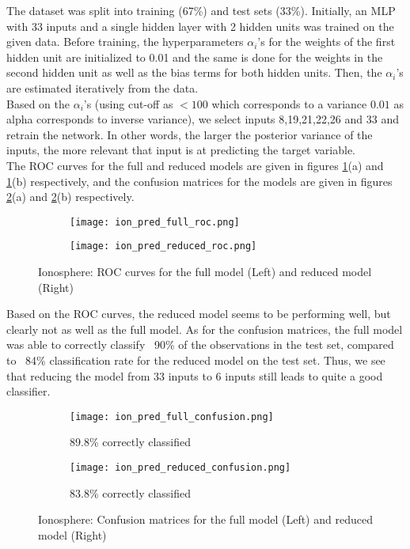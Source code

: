 \documentclass[paper=a4, fontsize=11pt]{scrartcl} %
\numberwithin{equation}{section} %
\begin{document}
The dataset was split into training (67\%) and test sets (33\%). Initially, an MLP with 33 inputs and a single hidden layer with 2 hidden units was trained on the given data. Before training, the hyperparameters $\alpha_i$'s for the weights of the first hidden unit are initialized to 0.01 and the same is done for the weights in the second hidden unit as well as the bias terms for both hidden units. Then, the $\alpha_i$'s are estimated iteratively from the data.\\

Based on the $\alpha_i$'s (using cut-off as $<100$ which corresponds to a variance $0.01$ as alpha corresponds to inverse variance), we select inputs 8,19,21,22,26 and 33 and retrain the network. In other words, the larger the posterior variance of the inputs, the more relevant that input is at predicting the target variable.\\

The ROC curves for the full and reduced models are given in figures \ref{ion_roc}(a) and \ref{ion_roc}(b) respectively, and the confusion matrices for the models are given in figures \ref{ion_conf}(a) and \ref{ion_conf}(b) respectively.\\

\begin{figure}[ht]
\begin{subfigure}{0.5\textwidth}
		\centering
		\texttt{[image: ion\_pred\_full\_roc.png]}
	\end{subfigure}
	\begin{subfigure}{0.5\textwidth}
		\centering
		\texttt{[image: ion\_pred\_reduced\_roc.png]}
	\end{subfigure}
\caption{Ionosphere: ROC curves for the full model (Left) and reduced model (Right)}
\label{ion_roc}
\end{figure}

Based on the ROC curves, the reduced model seems to be performing well, but clearly not as well as the full model. As for the confusion matrices, the full model was able to correctly classify ~90\% of the observations in the test set, compared to ~84\% classification rate for the reduced model on the test set. Thus, we see that reducing the model from 33 inputs to 6 inputs still leads to quite a good classifier.\\
 
\begin{figure}[ht]
\begin{subfigure}{0.5\textwidth}
		\centering
		\texttt{[image: ion\_pred\_full\_confusion.png]}
		\caption{89.8\% correctly classified}
	\end{subfigure}
	\begin{subfigure}{0.5\textwidth}
		\centering
		\texttt{[image: ion\_pred\_reduced\_confusion.png]}
		\caption{83.8\% correctly classified}
	\end{subfigure}
\caption{Ionosphere: Confusion matrices for the full model (Left) and reduced model (Right)}
\label{ion_conf}
\end{figure}
\end{document}

